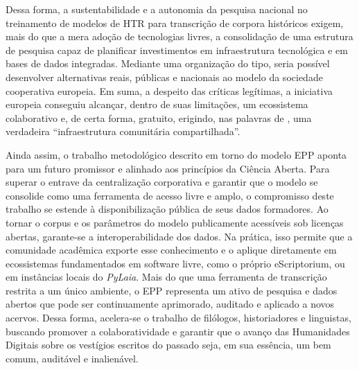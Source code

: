 \documentclass[portuguese]{textolivre}
\begin{document}
Dessa forma, a sustentabilidade e a autonomia da pesquisa nacional no treinamento de modelos de HTR para transcrição de corpora históricos exigem, mais do que a mera adoção de tecnologias livres, a consolidação de uma estrutura de pesquisa capaz de planificar investimentos em infraestrutura tecnológica e em bases de dados integradas. Mediante uma organização do tipo, seria possível desenvolver alternativas reais, públicas e nacionais ao modelo da sociedade cooperativa europeia. Em suma, a despeito das críticas legítimas, a iniciativa europeia conseguiu alcançar, dentro de suas limitações, um ecossistema colaborativo e, de certa forma, gratuito, erigindo, nas palavras de \textcite{terras2025artificial}, uma verdadeira “infraestrutura comunitária compartilhada”.

Ainda assim, o trabalho metodológico descrito em torno do modelo EPP aponta para um futuro promissor e alinhado aos princípios da Ciência Aberta. Para superar o entrave da centralização corporativa e garantir que o modelo se consolide como uma ferramenta de acesso livre e amplo, o compromisso deste trabalho se estende à disponibilização pública de seus dados formadores. Ao tornar o corpus e os parâmetros do modelo publicamente acessíveis sob licenças abertas, garante-se a interoperabilidade dos dados. Na prática, isso permite que a comunidade acadêmica exporte esse conhecimento e o aplique diretamente em ecossistemas fundamentados em software livre, como o próprio eScriptorium, ou em instâncias locais do \textit{PyLaia}. Mais do que uma ferramenta de transcrição restrita a um único ambiente, o EPP representa um ativo de pesquisa e dados abertos que pode ser continuamente aprimorado, auditado e aplicado a novos acervos. Dessa forma, acelera-se o trabalho de filólogos, historiadores e linguistas, buscando promover a colaboratividade e garantir que o avanço das Humanidades Digitais sobre os vestígios escritos do passado seja, em sua essência, um bem comum, auditável e inalienável.

\printbibliography\label{sec-bib}



\begin{dataavailability}
\end{dataavailability}
\end{document}
